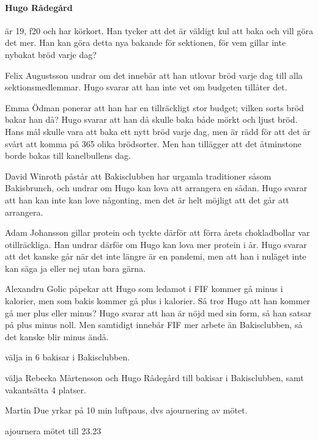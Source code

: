 \documentclass[hidelinks]{sektionsmote}
\begin{document}
\paragraph{Hugo Rådegård} är 19, f20 och har körkort.
Han tycker att det är väldigt kul att baka och vill göra det mer.
Han kan göra detta nya bakande för sektionen, för vem gillar inte nybakat bröd varje dag?

Felix Augustsson undrar om det innebär att han utlovar bröd varje dag till alla sektionsmedlemmar.
Hugo svarar att han inte vet om budgeten tillåter det.

Emma Ödman ponerar att han har en tillräckligt stor budget; vilken sorts bröd bakar han då?
Hugo svarar att han då skulle baka både mörkt och ljust bröd.
Hans mål skulle vara att baka ett nytt bröd varje dag, men är rädd för att det är svårt att komma på 365 olika brödsorter.
Men han tillägger att det åtminstone borde bakas till kanelbullens dag.

David Winroth påstår att Bakisclubben har urgamla traditioner såsom Bakisbrunch, och undrar om Hugo kan lova att arrangera en sådan.
Hugo svarar att han kan inte kan love någonting, men det är helt möjligt att det går att arrangera.

Adam Johansson gillar protein och tyckte därför att förra årets chokladbollar var otillräckliga.
Han undrar därför om Hugo kan lova mer protein i år.
Hugo svarar att det kanske går när det inte längre är en pandemi, men att han i nuläget inte kan säga ja eller nej utan bara gärna.

Alexandru Golic påpekar att Hugo som ledamot i FIF kommer gå minus i kalorier, men som bakis kommer gå plus i kalorier.
Så tror Hugo att han kommer gå mer plus eller minus?
Hugo svarar att han är nöjd med sin form, så han satsar på plus minus noll.
Men samtidigt innebär FIF mer arbete än Bakisclubben, så det kanske blir minus ändå.

\begin{beslut}
  \item välja in 6 bakisar i Bakisclubben.
  \item välja Rebecka Mårtensson och Hugo Rådegård till bakisar i Bakisclubben, samt vakantsätta 4 platser.
\end{beslut}

\begin{ofraga}
  Martin Due yrkar på 10 min luftpaus, dvs ajournering av mötet.
  \begin{beslut}
    \item ajournera mötet till 23.23
  \end{beslut}
\end{ofraga}
\end{document}
